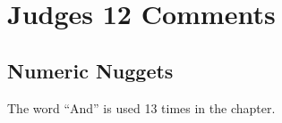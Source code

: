 \section{Judges 12 Comments}

\subsection{Numeric Nuggets}
The word ``And'' is used 13 times in the chapter.



